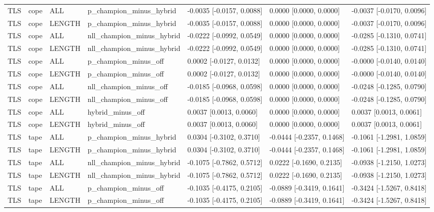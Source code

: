 \begin{tabular}{lllllll}
TLS & cope & ALL & p\_champion\_minus\_hybrid & -0.0035 [-0.0157, 0.0088] & 0.0000 [0.0000, 0.0000] & -0.0037 [-0.0170, 0.0096] \\
TLS & cope & LENGTH & p\_champion\_minus\_hybrid & -0.0035 [-0.0157, 0.0088] & 0.0000 [0.0000, 0.0000] & -0.0037 [-0.0170, 0.0096] \\
TLS & cope & ALL & nll\_champion\_minus\_hybrid & -0.0222 [-0.0992, 0.0549] & 0.0000 [0.0000, 0.0000] & -0.0285 [-0.1310, 0.0741] \\
TLS & cope & LENGTH & nll\_champion\_minus\_hybrid & -0.0222 [-0.0992, 0.0549] & 0.0000 [0.0000, 0.0000] & -0.0285 [-0.1310, 0.0741] \\
TLS & cope & ALL & p\_champion\_minus\_off & 0.0002 [-0.0127, 0.0132] & 0.0000 [0.0000, 0.0000] & -0.0000 [-0.0140, 0.0140] \\
TLS & cope & LENGTH & p\_champion\_minus\_off & 0.0002 [-0.0127, 0.0132] & 0.0000 [0.0000, 0.0000] & -0.0000 [-0.0140, 0.0140] \\
TLS & cope & ALL & nll\_champion\_minus\_off & -0.0185 [-0.0968, 0.0598] & 0.0000 [0.0000, 0.0000] & -0.0248 [-0.1285, 0.0790] \\
TLS & cope & LENGTH & nll\_champion\_minus\_off & -0.0185 [-0.0968, 0.0598] & 0.0000 [0.0000, 0.0000] & -0.0248 [-0.1285, 0.0790] \\
TLS & cope & ALL & hybrid\_minus\_off & 0.0037 [0.0013, 0.0060] & 0.0000 [0.0000, 0.0000] & 0.0037 [0.0013, 0.0061] \\
TLS & cope & LENGTH & hybrid\_minus\_off & 0.0037 [0.0013, 0.0060] & 0.0000 [0.0000, 0.0000] & 0.0037 [0.0013, 0.0061] \\
TLS & tape & ALL & p\_champion\_minus\_hybrid & 0.0304 [-0.3102, 0.3710] & -0.0444 [-0.2357, 0.1468] & -0.1061 [-1.2981, 1.0859] \\
TLS & tape & LENGTH & p\_champion\_minus\_hybrid & 0.0304 [-0.3102, 0.3710] & -0.0444 [-0.2357, 0.1468] & -0.1061 [-1.2981, 1.0859] \\
TLS & tape & ALL & nll\_champion\_minus\_hybrid & -0.1075 [-0.7862, 0.5712] & 0.0222 [-0.1690, 0.2135] & -0.0938 [-1.2150, 1.0273] \\
TLS & tape & LENGTH & nll\_champion\_minus\_hybrid & -0.1075 [-0.7862, 0.5712] & 0.0222 [-0.1690, 0.2135] & -0.0938 [-1.2150, 1.0273] \\
TLS & tape & ALL & p\_champion\_minus\_off & -0.1035 [-0.4175, 0.2105] & -0.0889 [-0.3419, 0.1641] & -0.3424 [-1.5267, 0.8418] \\
TLS & tape & LENGTH & p\_champion\_minus\_off & -0.1035 [-0.4175, 0.2105] & -0.0889 [-0.3419, 0.1641] & -0.3424 [-1.5267, 0.8418] \\

\end{tabular}
